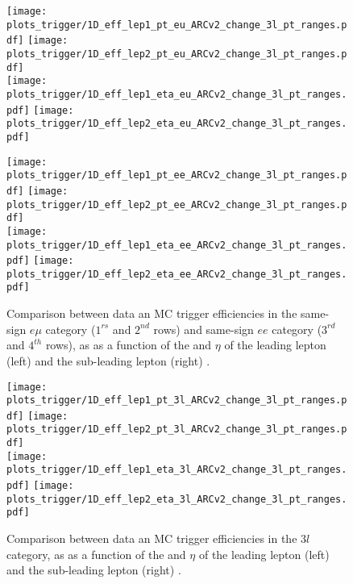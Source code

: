 \begin{figure}[htp]
\centering
\texttt{[image: plots\_trigger/1D\_eff\_lep1\_pt\_eu\_ARCv2\_change\_3l\_pt\_ranges.pdf]}
\texttt{[image: plots\_trigger/1D\_eff\_lep2\_pt\_eu\_ARCv2\_change\_3l\_pt\_ranges.pdf]} \\
\texttt{[image: plots\_trigger/1D\_eff\_lep1\_eta\_eu\_ARCv2\_change\_3l\_pt\_ranges.pdf]}
\texttt{[image: plots\_trigger/1D\_eff\_lep2\_eta\_eu\_ARCv2\_change\_3l\_pt\_ranges.pdf]}

\texttt{[image: plots\_trigger/1D\_eff\_lep1\_pt\_ee\_ARCv2\_change\_3l\_pt\_ranges.pdf]}
\texttt{[image: plots\_trigger/1D\_eff\_lep2\_pt\_ee\_ARCv2\_change\_3l\_pt\_ranges.pdf]} \\
\texttt{[image: plots\_trigger/1D\_eff\_lep1\_eta\_ee\_ARCv2\_change\_3l\_pt\_ranges.pdf]}
\texttt{[image: plots\_trigger/1D\_eff\_lep2\_eta\_ee\_ARCv2\_change\_3l\_pt\_ranges.pdf]}
\caption[Trigger efficiency for the $ee$ category]{Comparison between data an MC trigger efficiencies in the same-sign $e\mu$ category ($1^{rs}$ and $2^{nd}$ rows) and same-sign $ee$ category ($3^{rd}$ and $4^{th}$ rows), as as a function of the \pt and $\eta$ of the leading lepton (left) and the sub-leading lepton (right) \cite{CMS_AN_2017-029}.}
\label{fig:trigeffsee}
\end{figure}

\begin{figure}[htp]
\centering
\texttt{[image: plots\_trigger/1D\_eff\_lep1\_pt\_3l\_ARCv2\_change\_3l\_pt\_ranges.pdf]}
\texttt{[image: plots\_trigger/1D\_eff\_lep2\_pt\_3l\_ARCv2\_change\_3l\_pt\_ranges.pdf]} \\
\texttt{[image: plots\_trigger/1D\_eff\_lep1\_eta\_3l\_ARCv2\_change\_3l\_pt\_ranges.pdf]}
\texttt{[image: plots\_trigger/1D\_eff\_lep2\_eta\_3l\_ARCv2\_change\_3l\_pt\_ranges.pdf]}
\caption[Trigger efficiency for the $3l$ category]{Comparison between data an MC trigger efficiencies in the $3l$ category, as as a function of the \pt and $\eta$ of the leading lepton (left) and the sub-leading lepton (right) \cite{CMS_AN_2017-029}.}
\label{fig:trigeffs3l}
\end{figure}

